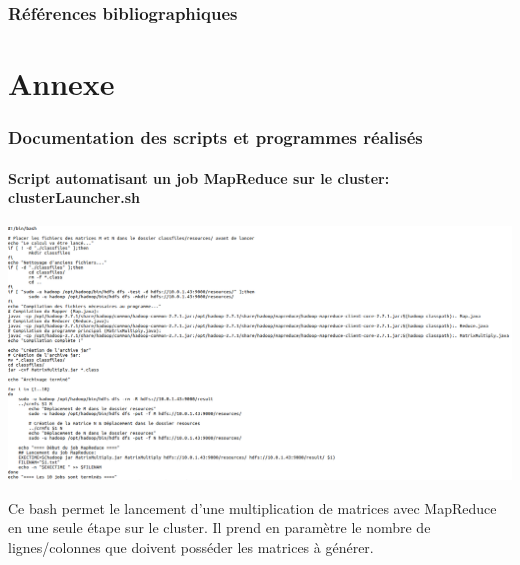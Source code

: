 \documentclass[a4paper, 11pt]{article}
\begin{document}
\newpage
\thispagestyle{plain}

\section*{Références bibliographiques}

\nocite{*}
\printbibliography


\appendix
\newpage
{}
\part{Annexe}

\section{Documentation des scripts et programmes réalisés}

	\subsection{Script automatisant un job MapReduce sur le cluster: clusterLauncher.sh}
    \label{clusterlauncher}
  	\begin{center}
        \includegraphics[scale=0.38, angle=90]{./img/codeClusterLauncherOSNS.png}
        \begin{turn}{90}
        \begin{minipage}{\linewidth}
        \vspace{2\baselineskip}
        Ce bash permet le lancement d'une multiplication de matrices avec MapReduce en une seule étape sur le cluster. Il prend en paramètre le nombre de lignes/colonnes que doivent posséder les matrices à générer.
		\end{minipage}
        \end{turn}
    \end{center}
    
\end{document}
